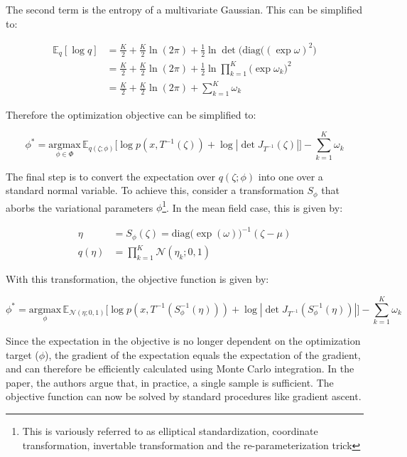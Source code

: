 \documentclass[10pt]{article}
\begin{document}
The second term is the entropy of a multivariate Gaussian. This can be simplified to:

\begin{align*}
  \mathbb{E}_q[\log q] &= \frac{K}{2} + \frac{K}{2}\ln(2\pi) + \frac{1}{2}\ln\det\big(\text{diag}((\exp \omega)^2\big) \\
  &= \frac{K}{2} + \frac{K}{2}\ln(2\pi) + \frac{1}{2}\ln\prod_{k=1}^K\big(\exp \omega_{k}\big)^2 \\
  &= \frac{K}{2} + \frac{K}{2}\ln(2\pi) + \sum_{k=1}^{K}\omega_k
\end{align*}

Therefore the optimization objective can be simplified to:

\begin{equation*}
  \phi^* = \underset{\phi \in \Phi}{\text{argmax}} \, \mathbb{E}_{q(\zeta; \phi)}\big[\log p(x, T^{-1}(\zeta)) + \log |\det J_{T^{-1}}(\zeta)|\big] - \sum_{k=1}^{K}\omega_k
\end{equation*}


The final step is to convert the expectation over $q(\zeta; \phi)$ into one over a standard normal variable. To achieve
this, consider a transformation $S_{\phi}$ that aborbs the variational parameters $\phi$\footnote{This is variously 
referred to as elliptical standardization, coordinate transformation, invertable transformation and the re-parameterization
trick}. In the mean field case, this is given by:

\begin{align*}
  \eta &= S_{\phi}(\zeta) = \text{diag}\big(\exp(\omega)\big)^{-1}(\zeta - \mu) \\
  q(\eta) &= \prod_{k=1}^{K}\mathcal{N}(\eta_k; 0, 1)
\end{align*}


With this transformation, the objective function is given by:

\begin{equation*}
  \phi^* = \underset{\phi}{\text{argmax}} \, \mathbb{E}_{\mathcal{N}(\eta; 0, 1)}\big[\log p(x, T^{-1}(S_\phi^{-1}(\eta))) + \log |\det J_{T^{-1}}(S_\phi^{-1}(\eta))|\big] - \sum_{k=1}^{K}\omega_k
\end{equation*}

Since the expectation in the objective is no longer dependent on the optimization target ($\phi$), the gradient of the expectation
equals the expectation of the gradient, and can therefore be efficiently calculated using Monte Carlo integration. In the paper, 
the authors argue that, in practice, a single sample is sufficient. The objective function can now be solved by standard procedures
like gradient ascent. 
\end{document}
